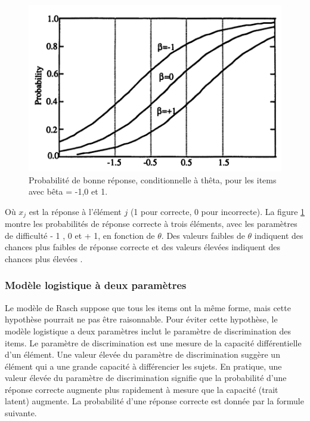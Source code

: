\begin{figure}[H]
	\begin{center}
		\includegraphics[width=\textwidth]{images/chapitre5/parameters_probability.png}
	\end{center}
	\caption{Probabilité de bonne réponse, conditionnelle à thêta, pour les items avec bêta = -1,0 et 1.}
	\label{parameters_probability}
\end{figure}
Où \(\displaystyle x_{j} \)  est la réponse à l'élément \(\displaystyle j \) (1 pour correcte, 0 pour incorrecte). La figure \ref{parameters_probability} montre les probabilités de réponse correcte à trois éléments, avec les paramètres de difficulté - 1 , 0 et + 1, en fonction de \(\displaystyle \theta \). Des valeurs faibles de \(\displaystyle \theta \) indiquent des chances plus faibles de réponse correcte et des valeurs élevées indiquent des chances plus élevées \cite{mislevy1994evidence}.

\subsubsection{Modèle logistique à deux paramètres}
Le modèle de Rasch suppose que tous les items ont la même forme, mais cette hypothèse pourrait ne pas être raisonnable. Pour éviter cette hypothèse, le modèle logistique a deux paramètres inclut le paramètre de discrimination des items. Le paramètre de discrimination est une mesure de la capacité différentielle d'un élément. Une valeur élevée du paramètre de discrimination suggère un élément qui a une grande capacité à différencier les sujets. En pratique, une valeur élevée du paramètre de discrimination signifie que la probabilité d'une réponse correcte augmente plus rapidement à mesure que la capacité (trait latent) augmente. La probabilité d'une réponse correcte est donnée par la formule suivante. \\

